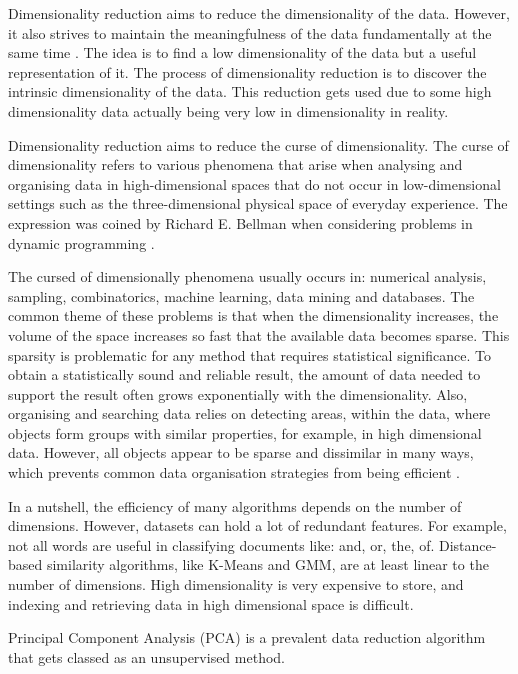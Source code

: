 		Dimensionality reduction aims to reduce the dimensionality of the data. However, it also strives to maintain the meaningfulness of the data fundamentally at the same time \cite{jason_lectures_LDA}. The idea is to find a low dimensionality of the data but a useful representation of it. The process of dimensionality reduction is to discover the intrinsic dimensionality of the data. This reduction gets used due to some high dimensionality data actually being very low in dimensionality in reality.
		
		Dimensionality reduction aims to reduce the curse of dimensionality. The curse of dimensionality refers to various phenomena that arise when analysing and organising data in high-dimensional spaces that do not occur in low-dimensional settings such as the three-dimensional physical space of everyday experience. The expression was coined by Richard E. Bellman when considering problems in dynamic programming \cite{jason_lectures_LDA}.
		
		The cursed of dimensionally phenomena usually occurs in: numerical analysis, sampling, combinatorics, machine learning, data mining and databases. The common theme of these problems is that when the dimensionality increases, the volume of the space increases so fast that the available data becomes sparse. This sparsity is problematic for any method that requires statistical significance. To obtain a statistically sound and reliable result, the amount of data needed to support the result often grows exponentially with the dimensionality. Also, organising and searching data relies on detecting areas, within the data, where objects form groups with similar properties, for example, in high dimensional data. However, all objects appear to be sparse and dissimilar in many ways, which prevents common data organisation strategies from being efficient \cite{geron2019hands}.
		
		In a nutshell, the efficiency of many algorithms depends on the number of dimensions. However, datasets can hold a lot of redundant features. For example, not all words are useful in classifying documents like: and, or, the, of. Distance-based similarity algorithms, like K-Means and GMM, are at least linear to the number of dimensions. High dimensionality is very expensive to store, and indexing and retrieving data in high dimensional space is difficult.
	
		Principal Component Analysis (PCA) is a prevalent data reduction algorithm that gets classed as an unsupervised method. 
		
